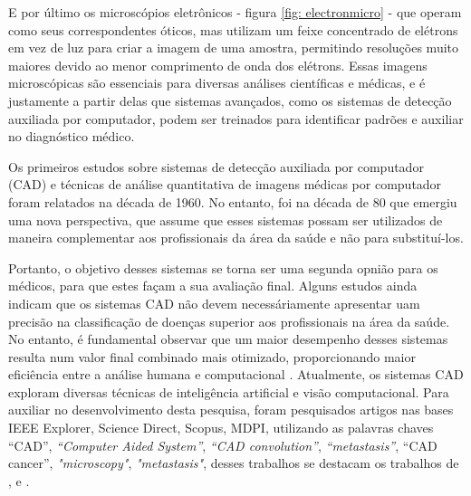 E por último os microscópios eletrônicos - figura \ref{fig: electronmicro} - que operam como seus correspondentes óticos, mas utilizam um feixe concentrado de elétrons em vez de luz para criar a imagem de uma amostra, permitindo resoluções muito maiores devido ao menor comprimento de onda dos elétrons. Essas imagens microscópicas são essenciais para diversas análises científicas e médicas, e é justamente a partir delas que sistemas avançados, como os sistemas de detecção auxiliada por computador, podem ser treinados para identificar padrões e auxiliar no diagnóstico médico.

%



Os primeiros estudos sobre sistemas de detecção auxiliada por computador (CAD) e técnicas de análise quantitativa de imagens médicas por computador foram relatados na década de 1960. No entanto, foi na década de 80 que emergiu uma nova perspectiva, que assume que esses sistemas possam ser utilizados de maneira complementar aos profissionais da área da saúde e não para substituí-los. 

Portanto, o objetivo desses sistemas se torna ser uma segunda opnião para os médicos, para que estes façam a sua avaliação final. Alguns estudos ainda indicam que os sistemas CAD não devem necessáriamente apresentar uam precisão na classificação de doenças superior aos profissionais na área da saúde. No entanto, é fundamental observar que um maior desempenho desses sistemas resulta num valor final combinado mais otimizado, proporcionando maior eficiência entre a análise humana e computacional \cite{DOI2007198}. Atualmente, os sistemas CAD exploram diversas técnicas de inteligência artificial e visão computacional. Para auxiliar no desenvolvimento desta pesquisa, foram pesquisados artigos nas bases IEEE Explorer, Science Direct, Scopus, MDPI, utilizando as palavras chaves “CAD”, \textit{“Computer Aided System”}, \textit{“CAD convolution”}, \textit{“metastasis”}, “CAD cancer”, \textit{"microscopy"}, \textit{"metastasis"}, desses trabalhos se destacam os trabalhos de ,  e .

